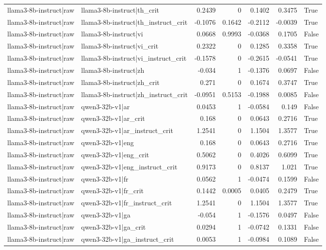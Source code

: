 \begin{table}
\begin{tabular}{l l r r r r l}
llama3-8b-instruct|raw & llama3-8b-instruct|th_crit & 0.2439 & 0 & 0.1402 & 0.3475 & True \\
llama3-8b-instruct|raw & llama3-8b-instruct|th_instruct_crit & -0.1076 & 0.1642 & -0.2112 & -0.0039 & True \\
llama3-8b-instruct|raw & llama3-8b-instruct|vi & 0.0668 & 0.9993 & -0.0368 & 0.1705 & False \\
llama3-8b-instruct|raw & llama3-8b-instruct|vi_crit & 0.2322 & 0 & 0.1285 & 0.3358 & True \\
llama3-8b-instruct|raw & llama3-8b-instruct|vi_instruct_crit & -0.1578 & 0 & -0.2615 & -0.0541 & True \\
llama3-8b-instruct|raw & llama3-8b-instruct|zh & -0.034 & 1 & -0.1376 & 0.0697 & False \\
llama3-8b-instruct|raw & llama3-8b-instruct|zh_crit & 0.271 & 0 & 0.1674 & 0.3747 & True \\
llama3-8b-instruct|raw & llama3-8b-instruct|zh_instruct_crit & -0.0951 & 0.5153 & -0.1988 & 0.0085 & False \\
llama3-8b-instruct|raw & qwen3-32b-v1|ar & 0.0453 & 1 & -0.0584 & 0.149 & False \\
llama3-8b-instruct|raw & qwen3-32b-v1|ar_crit & 0.168 & 0 & 0.0643 & 0.2716 & True \\
llama3-8b-instruct|raw & qwen3-32b-v1|ar_instruct_crit & 1.2541 & 0 & 1.1504 & 1.3577 & True \\
llama3-8b-instruct|raw & qwen3-32b-v1|eng & 0.168 & 0 & 0.0643 & 0.2716 & True \\
llama3-8b-instruct|raw & qwen3-32b-v1|eng_crit & 0.5062 & 0 & 0.4026 & 0.6099 & True \\
llama3-8b-instruct|raw & qwen3-32b-v1|eng_instruct_crit & 0.9173 & 0 & 0.8137 & 1.021 & True \\
llama3-8b-instruct|raw & qwen3-32b-v1|fr & 0.0562 & 1 & -0.0474 & 0.1599 & False \\
llama3-8b-instruct|raw & qwen3-32b-v1|fr_crit & 0.1442 & 0.0005 & 0.0405 & 0.2479 & True \\
llama3-8b-instruct|raw & qwen3-32b-v1|fr_instruct_crit & 1.2541 & 0 & 1.1504 & 1.3577 & True \\
llama3-8b-instruct|raw & qwen3-32b-v1|ga & -0.054 & 1 & -0.1576 & 0.0497 & False \\
llama3-8b-instruct|raw & qwen3-32b-v1|ga_crit & 0.0294 & 1 & -0.0742 & 0.1331 & False \\
llama3-8b-instruct|raw & qwen3-32b-v1|ga_instruct_crit & 0.0053 & 1 & -0.0984 & 0.1089 & False \\

\end{tabular}
\end{table}
